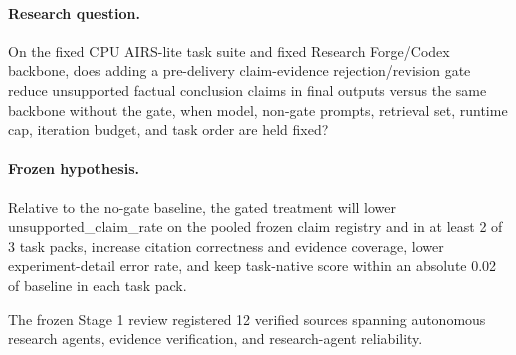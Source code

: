 \documentclass[11pt]{article}
\begin{document}
\paragraph{Research question.} On the fixed CPU AIRS-lite task suite and fixed Research Forge/Codex backbone, does adding a pre-delivery claim-evidence rejection/revision gate reduce unsupported factual conclusion claims in final outputs versus the same backbone without the gate, when model, non-gate prompts, retrieval set, runtime cap, iteration budget, and task order are held fixed?

\paragraph{Frozen hypothesis.} Relative to the no-gate baseline, the gated treatment will lower unsupported\_claim\_rate on the pooled frozen claim registry and in at least 2 of 3 task packs, increase citation correctness and evidence coverage, lower experiment-detail error rate, and keep task-native score within an absolute 0.02 of baseline in each task pack.

The frozen Stage 1 review registered 12 verified sources spanning autonomous research agents, evidence verification, and research-agent reliability.
\end{document}
